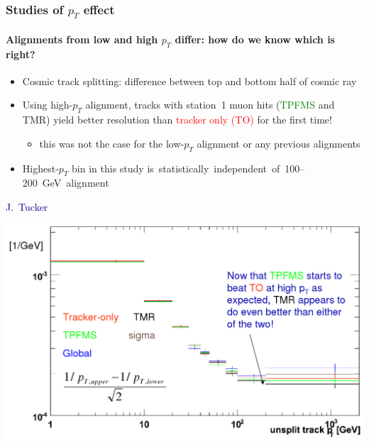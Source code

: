 \documentclass[compress]{beamer}
\begin{document}
\begin{frame}
\frametitle{Studies of $p_T$ effect}
\framesubtitle{Alignments from low and high $p_T$ differ: how do we know which is right?}
\scriptsize

\begin{itemize}
\item Cosmic track splitting: difference between top and bottom half of cosmic ray
\item Using high-$p_T$ alignment, tracks with station~1 muon hits (\textcolor{green}{TPFMS} and TMR) yield better resolution than \textcolor{red}{tracker only (TO)} for the first time!
\begin{itemize}\scriptsize
\item this was not the case for the low-$p_T$ alignment or any previous alignments
\end{itemize}
\item Highest-$p_T$ bin in this study \mbox{is statistically independent of 100--200~GeV alignment\hspace{-1 cm}}
\end{itemize}

\hfill \scriptsize \textcolor{darkblue}{J.~Tucker}

\vspace{-\baselineskip}
\includegraphics[width=0.87\linewidth]{cosmicsplitting_jordan.png}
\end{frame}
\end{document}
